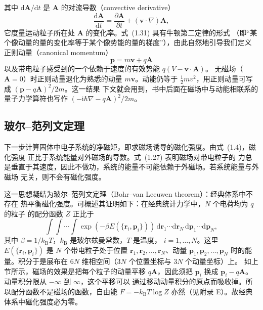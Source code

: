 其中 $\mathrm{d}\mathbf{A}/\mathrm{d}t$ 是 $\mathbf{A}$ 的对流导数（convective derivative）
\begin{equation*}
\frac{\mathrm{d}\mathbf{A}}{\mathrm{d}t} = \frac{\partial\mathbf{A}}{\partial t} + (\mathbf{v}\cdot\nabla)\mathbf{A},\tag{1.32}
\end{equation*}
它度量运动粒子所在处 $\mathbf{A}$ 的变化率。式~(1.31) 具有牛顿第二定律的形式
（即“某个像动量的量的变化率等于某个像势能的量的梯度”），由此自然地引导我们定义
正则动量（canonical momentum）
\begin{equation*}
\mathbf{p} = m\mathbf{v} + q\mathbf{A}\tag{1.33}
\end{equation*}
以及带电粒子感受到的一个依赖于速度的有效势能 $q(V-\mathbf{v}\cdot\mathbf{A})$。
无磁场（$\mathbf{A}=0$）时正则动量退化为熟悉的动量 $m\mathbf{v}$。动能仍等于
$\frac{1}{2}mv^{2}$，用正则动量可写成 $(\mathbf{p}-q\mathbf{A})^{2}/2m$。这一结果
下文就会用到，书中后面在磁场中与动能相联系的量子力学算符也写作
$(-\mathrm{i}\hbar\nabla-q\mathbf{A})^{2}/2m$。

\subsection{玻尔--范列文定理}

下一步计算固体中电子系统的净磁矩，即求磁场诱导的磁化强度。由式~(1.4)，磁化强度
正比于系统能量对外磁场的导数。式~(1.27) 表明磁场对带电粒子的
力总是垂直于其速度，因此不做功，系统的能量不可能依赖于外磁场。若系统能量与外磁场
无关，则不会有磁化强度。

这一思想凝结为玻尔--范列文定理（Bohr--van Leeuwen theorem）：经典体系中不存在
热平衡磁化强度。可概述其证明如下：在经典统计力学中，$N$ 个电荷均为 $q$ 的粒子
的配分函数 $Z$ 正比于
\begin{equation*}
\int\!\!\int\!\cdots\!\int \exp(-\beta E(\{\mathbf{r}_i,\mathbf{p}_i\}))\,\mathrm{d}\mathbf{r}_1\cdots\mathrm{d}\mathbf{r}_N\,\mathrm{d}\mathbf{p}_1\cdots\mathrm{d}\mathbf{p}_N,\tag{1.34}
\end{equation*}
其中 $\beta=1/k_{\mathrm{B}}T$，$k_{\mathrm{B}}$ 是玻尔兹曼常数，$T$ 是温度，
$i=1,\ldots,N$。这里 $E(\{\mathbf{r}_i,\mathbf{p}_i\})$ 是 $N$ 个带电粒子处于位置
$\mathbf{r}_1,\mathbf{r}_2,\ldots,\mathbf{r}_N$、动量 $\mathbf{p}_1,\mathbf{p}_2,\ldots,\mathbf{p}_N$
时的能量。积分于是展布在 $6N$ 维相空间（$3N$ 个位置坐标与 $3N$ 个动量坐标）上。
如上节所示，磁场的效果是把每个粒子的动量平移 $q\mathbf{A}$，因此须把 $\mathbf{p}_i$
换成 $\mathbf{p}_i-q\mathbf{A}$。动量积分限从 $-\infty$ 到 $\infty$，这个平移可以
通过移动动量积分的原点而吸收掉。所以配分函数不是磁场的函数，自由能
$F=-k_{\mathrm{B}}T\log Z$ 亦然（见附录 E）。故经典体系中磁化强度必为零。

